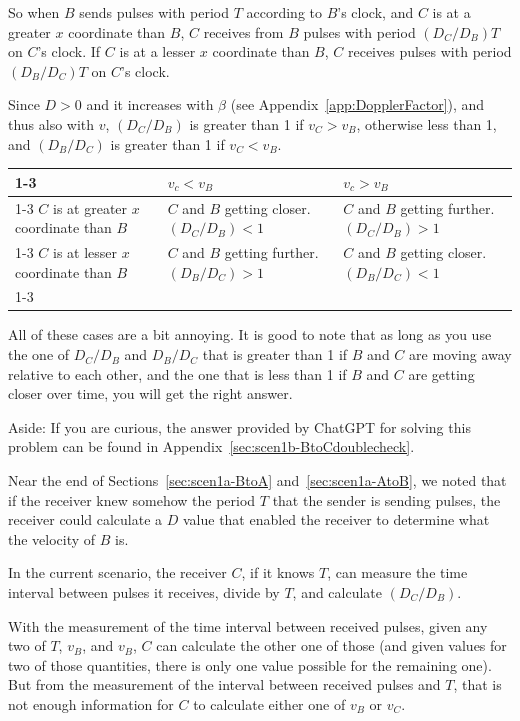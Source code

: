 \documentclass[a4paper]{article}
\theoremstyle{plain}
\theoremstyle{definition}
\begin{document}
So when $B$ sends pulses with period $T$ according to $B$'s clock, and
$C$ is at a greater $x$ coordinate than $B$, $C$ receives from $B$
pulses with period $(D_C / D_B) T$ on $C$'s clock.  If $C$ is at a
lesser $x$ coordinate than $B$, $C$ receives pulses with period
$(D_B / D_C) T$ on $C$'s clock.

Since $D > 0$ and it increases with $\beta$ (see
Appendix~\ref{app:DopplerFactor}), and thus also with $v$,
$(D_C / D_B)$ is greater than 1 if $v_C > v_B$, otherwise less than 1,
and $(D_B / D_C)$ is greater than 1 if $v_C < v_B$.

\begin{tabularx}{1.0\textwidth}{|p{4cm}|p{4cm}|p{4cm}|}
\cline{1-3}
       & $v_c < v_B$ & $v_c > v_B$
\\ \cline{1-3}
$C$ is at greater $x$ coordinate than $B$ & $C$ and $B$ getting closer.  $(D_C / D_B) < 1$ & $C$ and $B$ getting further.  $(D_C / D_B) > 1$
\\ \cline{1-3}
$C$ is at lesser $x$ coordinate than $B$ & $C$ and $B$ getting further.  $(D_B / D_C) > 1$ & $C$ and $B$ getting closer.  $(D_B / D_C) < 1$
\\ \cline{1-3}
\end{tabularx}

All of these cases are a bit annoying.  It is good to note that as
long as you use the one of $D_C / D_B$ and $D_B / D_C$ that is greater
than 1 if $B$ and $C$ are moving away relative to each other, and the
one that is less than 1 if $B$ and $C$ are getting closer over time,
you will get the right answer.

Aside: If you are curious, the answer provided by ChatGPT for solving
this problem can be found in Appendix~\ref{sec:scen1b-BtoCdoublecheck}.

Near the end of Sections~\ref{sec:scen1a-BtoA} and~\ref{sec:scen1a-AtoB},
we noted that if the receiver knew somehow the period $T$ that the
sender is sending pulses, the receiver could calculate a $D$ value
that enabled the receiver to determine what the velocity of $B$ is.

In the current scenario, the receiver $C$, if it knows $T$, can
measure the time interval between pulses it receives, divide by $T$,
and calculate $(D_C / D_B)$.

With the measurement of the time interval between received pulses,
given any two of $T$, $v_B$, and $v_B$, $C$ can calculate the other
one of those (and given values for two of those quantities, there is
only one value possible for the remaining one).
But from the measurement of the interval between received pulses and
$T$, that is not enough information for $C$ to calculate either one of
$v_B$ or $v_C$.
\end{document}
